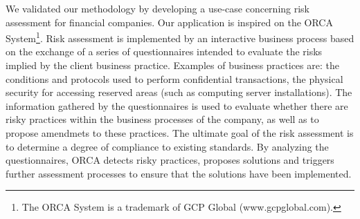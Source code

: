 %
%
%
%
%

We validated our methodology by developing a use-case concerning risk assessment for financial companies.
Our application is inspired on the ORCA System\footnote{The ORCA System is a trademark of GCP Global (www.gcpglobal.com).}.
Risk assessment is implemented by an interactive business process based on the exchange of a series of questionnaires intended to evaluate the risks implied by the client business practice.
Examples of business practices are: the conditions and protocols used to perform confidential transactions, the physical security for accessing reserved areas (such as computing server installations).
The information gathered by the questionnaires is used to evaluate whether there are risky practices within the business processes of the company, as well as to propose amendmets to these practices.
The ultimate goal of the risk assessment is to determine a degree of compliance to existing standards.
By analyzing the questionnaires, ORCA detects risky practices, proposes solutions and triggers further assessment processes to ensure that the solutions have been implemented.


